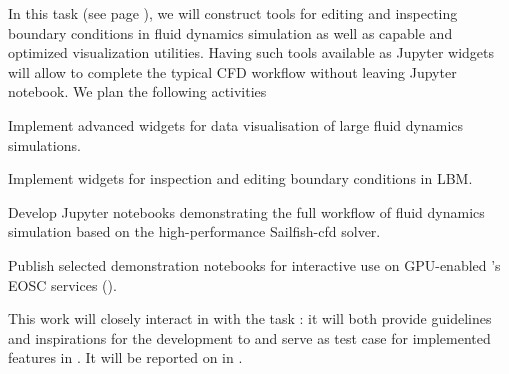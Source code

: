 \begin{task}[
  title=Demonstrator: Visualisation and control of fluid dynamics in Jupyter notebook,
  id=application-gpu,
  lead=SIL,
  PM=12,
  wphases={4-36},
  partners={EGI}
]


In this task (see page \pageref{sec:concept-demonstrator-gpu}), we will construct tools for editing and inspecting boundary conditions in fluid dynamics simulation as well as capable and optimized visualization utilities. 
Having such tools available as Jupyter widgets will allow to complete the typical CFD workflow without leaving Jupyter notebook. We plan the following activities
\begin{compactitem}

\item Implement advanced widgets for data visualisation of large
  fluid dynamics simulations.
\item Implement widgets for inspection and editing boundary
  conditions in LBM.
\item Develop Jupyter notebooks demonstrating the full workflow of  fluid
  dynamics simulation based on the high-performance Sailfish-cfd solver.
  \item Publish selected demonstration notebooks for interactive use on
    GPU-enabled \TheProject's EOSC services ().
\end{compactitem}

This work will closely interact in with the task
: it will both provide guidelines and inspirations
for the development to  and serve
as test case for implemented features in
.
%
  It will be reported on in
  .
\end{task}
